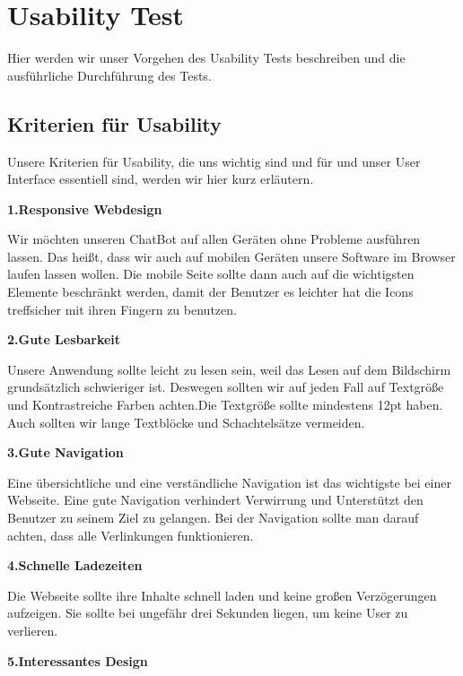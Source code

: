 \section{Usability Test}
Hier werden wir unser Vorgehen des Usability Tests beschreiben und die ausführliche
Durchführung des Tests.

\subsection{Kriterien für Usability}
Unsere Kriterien für Usability, die uns wichtig sind und für und unser User Interface
essentiell sind, werden wir hier kurz erläutern.
\newline

\noindent\textbf{1.Responsive Webdesign}

\noindent Wir möchten unseren ChatBot auf allen Geräten ohne Probleme ausführen lassen.
Das heißt, dass wir auch auf mobilen Geräten unsere Software im Browser laufen lassen wollen.
Die mobile Seite sollte dann auch auf die wichtigsten Elemente beschränkt werden, damit
der Benutzer es leichter hat die Icons treffsicher mit ihren Fingern zu benutzen.
\newline

\noindent\textbf{2.Gute Lesbarkeit}

\noindent Unsere Anwendung sollte leicht zu lesen sein, weil das Lesen auf dem Bildschirm
grundsätzlich schwieriger ist. Deswegen sollten wir auf jeden Fall
auf Textgröße und Kontrastreiche Farben achten.Die Textgröße sollte mindestens
12pt haben. Auch sollten wir lange Textblöcke und
Schachtelsätze vermeiden.
\newline

\noindent\textbf{3.Gute Navigation}

\noindent Eine übersichtliche und eine verständliche Navigation ist das wichtigste bei einer Webseite.
Eine gute Navigation verhindert Verwirrung und Unterstützt den Benutzer zu seinem Ziel zu gelangen.
Bei der Navigation sollte man darauf achten, dass alle Verlinkungen funktionieren.
\newline

\noindent\textbf{4.Schnelle Ladezeiten}

\noindent Die Webseite sollte ihre Inhalte schnell laden und keine großen Verzögerungen
aufzeigen. Sie sollte bei ungefähr drei Sekunden liegen, um keine User zu verlieren.
\newline

\noindent\textbf{5.Interessantes Design}

